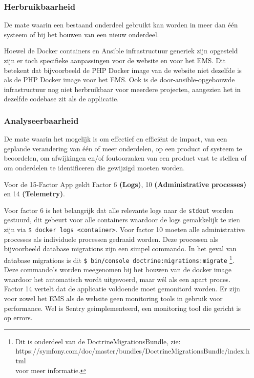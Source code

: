 \subsubsection{Herbruikbaarheid}
De mate waarin een bestaand onderdeel gebruikt kan worden in meer dan één systeem of bij het bouwen van een nieuw onderdeel.

Hoewel de Docker containers en Ansible infrastructuur generiek zijn opgesteld zijn er toch specifieke aanpassingen voor de website en voor het EMS. Dit betekent dat bijvoorbeeld de PHP Docker image van de website niet dezelfde is als de PHP Docker image voor het EMS. Ook is de door-ansible-opgebouwde infrastructuur nog niet herbruikbaar voor meerdere projecten, aangezien het in dezelfde codebase zit als de applicatie.

\subsubsection{Analyseerbaarheid}
De mate waarin het mogelijk is om effectief en efficiënt de impact, van een geplande verandering van één of meer onderdelen, op een product of systeem te beoordelen, om afwijkingen en/of foutoorzaken van een product vast te stellen of om onderdelen te identificeren die gewijzigd moeten worden.

Voor de 15-Factor App geldt Factor 6 \textbf{(Logs)}, 10 \textbf{(Administrative processes)} en 14 \textbf{(Telemetry)}.

Voor factor 6 is het belangrijk dat alle relevante logs naar de \texttt{stdout} worden gestuurd, dit gebeurt voor alle containers waardoor de logs gemakkelijk te zien zijn via \texttt{\$ docker logs <container>}. Voor factor 10 moeten alle administrative processes als individuele processen gedraaid worden. Deze processen als bijvoorbeeld database migrations zijn een simpel commando. In het geval van database migrations is dit \texttt{\$ bin/console doctrine:migrations:migrate} \footnote{Dit is onderdeel van de DoctrineMigrationsBundle, zie:\\ https://symfony.com/doc/master/bundles/DoctrineMigrationsBundle/index.html\\voor meer informatie.}. Deze commando's worden meegenomen bij het bouwen van de docker image waardoor het automatisch wordt uitgevoerd, maar wél als een apart proces. Factor 14 vertelt dat de applicatie voldoende moet gemonitord worden. Er zijn voor zowel het EMS als de website geen monitoring tools in gebruik voor performance. Wel is Sentry geimplementeerd, een monitoring tool die gericht is op errors.

